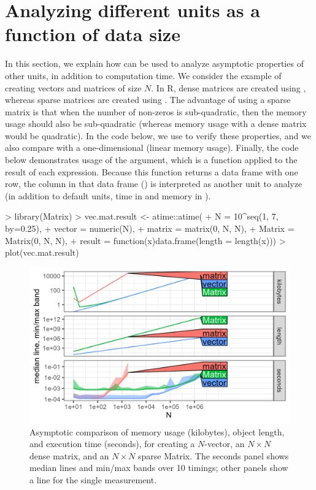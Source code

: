 \section{Analyzing different units as a function of data size}
In this section, we explain how  can be used to analyze asymptotic properties of other units, in addition to computation time.
We consider the example of creating vectors and matrices of size $N$.
In R, dense matrices are created using , whereas sparse matrices are created using .
The advantage of using a sparse matrix is that when the number of non-zeros is sub-quadratic, then the memory usage should also be sub-quadratic (whereas memory usage with a dense matrix would be quadratic).
In the code below, we use  to verify these properties, and we also compare with a one-dimensional  (linear memory usage). 
Finally, the code below demonstrates usage of the  argument, which is a function applied to the result of each expression.
Because this function returns a data frame with one row, the column in that data frame () is interpreted as another unit to analyze (in addition to default units, time in  and memory in ).
\begin{Schunk}
\begin{Sinput}
> library(Matrix)
> vec.mat.result <- atime::atime(
+   N = 10^seq(1, 7, by=0.25),  
+   vector = numeric(N),
+   matrix = matrix(0, N, N),
+   Matrix = Matrix(0, N, N),
+   result = function(x)data.frame(length = length(x)))
> plot(vec.mat.result)
\end{Sinput}
\end{Schunk}
\begin{figure}[t]
    \centering
    \includegraphics[width=0.9\linewidth]{vec.mat.result.plot.png}
    \caption{Asymptotic comparison of memory usage (kilobytes), object length, and execution time (seconds), for creating a $N$-vector, an $N\times N$ dense matrix, and an $N\times N$ sparse Matrix.
    The seconds panel shows median lines and min/max bands over 10 timings; 
    other panels show a line for the single measurement.}
    \label{fig:vector-matrix-length-seconds-kilobytes}
\end{figure}
